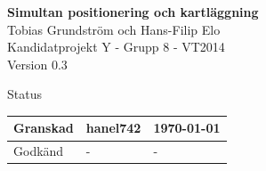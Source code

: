 \documentclass[a4paper,12pt,fleqn]{article}
\begin{document}
	\pagestyle{fancy}
	\vspace*{\fill}
		\begingroup
			\begin{center}
				\huge{\textbf{Simultan positionering och kartläggning}}
				\\
				\vspace{10pt}
				\normalsize
				Tobias Grundström och Hans-Filip Elo
				\\
				Kandidatprojekt Y - Grupp 8 - VT2014
				\\
				Version 0.3
				\end{center}
		\endgroup
	\vspace*{\fill}

	\begin{center} %
		Status
		\\
		\vspace{3pt} %
	    \begin{tabular}{| p{3cm} | p{3cm} | p{3cm} |} %
	    \hline %
	    Granskad & hanel742 & \today \\ \hline %
		Godkänd & - & - \\ \hline %

	    \end{tabular}
	\end{center}
	\vspace{2cm}
	\newpage
\end{document}

